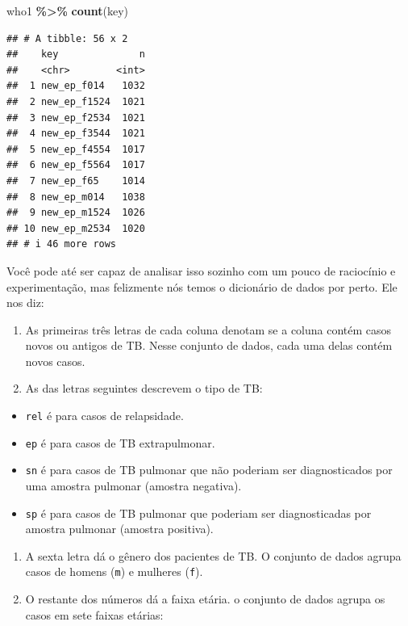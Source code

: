 \documentclass[
]{latex/krantz}
\newenvironment{Shaded}{\begin{snugshade}}{\end{snugshade}}
\newcommand{\FunctionTok}[1]{\textcolor[rgb]{0.13,0.29,0.53}{\textbf{#1}}}
\newcommand{\NormalTok}[1]{#1}
\newcommand{\SpecialCharTok}[1]{\textcolor[rgb]{0.81,0.36,0.00}{\textbf{#1}}}
\providecommand{\tightlist}{%
  \setlength{\itemsep}{0pt}\setlength{\parskip}{0pt}}
\theoremstyle{definition}
\theoremstyle{definition}
\theoremstyle{definition}
\theoremstyle{definition}
\theoremstyle{remark}
\begin{document}
\begin{Shaded}
\begin{Highlighting}[]
\NormalTok{who1 }\SpecialCharTok{\%\textgreater{}\%}
  \FunctionTok{count}\NormalTok{(key)}
\end{Highlighting}
\end{Shaded}

\begin{verbatim}
## # A tibble: 56 x 2
##    key              n
##    <chr>        <int>
##  1 new_ep_f014   1032
##  2 new_ep_f1524  1021
##  3 new_ep_f2534  1021
##  4 new_ep_f3544  1021
##  5 new_ep_f4554  1017
##  6 new_ep_f5564  1017
##  7 new_ep_f65    1014
##  8 new_ep_m014   1038
##  9 new_ep_m1524  1026
## 10 new_ep_m2534  1020
## # i 46 more rows
\end{verbatim}

Você pode até ser capaz de analisar isso sozinho com um pouco de raciocínio e experimentação, mas felizmente nós temos o dicionário de dados por perto. Ele nos diz:

\begin{enumerate}
\def\labelenumi{\arabic{enumi}.}
\tightlist
\item
  As primeiras três letras de cada coluna denotam se a coluna contém casos novos ou antigos de TB. Nesse conjunto de dados, cada uma delas contém novos casos.
\item
  As das letras seguintes descrevem o tipo de TB:
\end{enumerate}

\begin{itemize}
\tightlist
\item
  \texttt{rel} é para casos de relapsidade.
\item
  \texttt{ep} é para casos de TB extrapulmonar.
\item
  \texttt{sn} é para casos de TB pulmonar que não poderiam ser diagnosticados por uma amostra pulmonar (amostra negativa).
\item
  \texttt{sp} é para casos de TB pulmonar que poderiam ser diagnosticadas por amostra pulmonar (amostra positiva).
\end{itemize}

\begin{enumerate}
\def\labelenumi{\arabic{enumi}.}
\setcounter{enumi}{2}
\tightlist
\item
  A sexta letra dá o gênero dos pacientes de TB. O conjunto de dados agrupa casos de homens (\texttt{m}) e mulheres (\texttt{f}).
\item
  O restante dos números dá a faixa etária. o conjunto de dados agrupa os casos em sete faixas etárias:
\end{enumerate}
\end{document}

